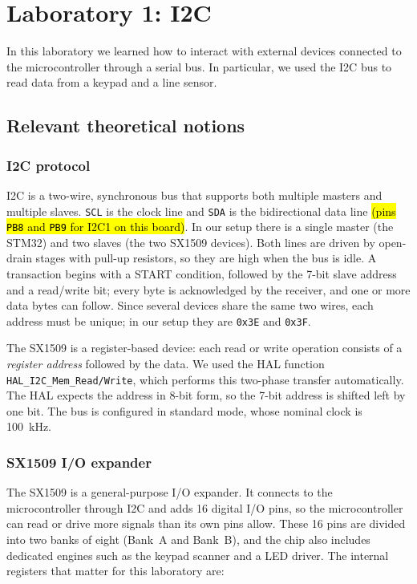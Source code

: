 \documentclass[english]{article}
\begin{document}
\tableofcontents \newpage

\section{Laboratory 1: I2C}

In this laboratory we learned how to interact with external devices connected to the microcontroller through a
serial bus. In particular, we used the I2C bus to read data from a keypad and a line sensor.

\subsection{Relevant theoretical notions}
\label{sec:lab1-theory}

\subsubsection{I2C protocol}

I2C is a two-wire, synchronous bus that supports both multiple masters and multiple slaves. \texttt{SCL} is
the clock line and \texttt{SDA} is the bidirectional data line \hl{(pins \texttt{PB8} and \texttt{PB9} for
  I2C1 on this board)}. In our setup there is a single master (the STM32) and two slaves (the two SX1509
devices). Both lines are driven by open-drain stages with pull-up resistors, so they are high when the bus is
idle. A transaction begins with a START condition, followed by the 7-bit slave address and a read/write bit;
every byte is acknowledged by the receiver, and one or more data bytes can follow. Since several devices
share the same two wires, each address must be unique; in our setup they are \texttt{0x3E} and \texttt{0x3F}.

The SX1509 is a register-based device: each read or write operation consists of a \emph{register address}
followed by the data. We used the HAL function \texttt{HAL\_I2C\_Mem\_Read/Write}, which performs this
two-phase transfer automatically. The HAL expects the address in 8-bit form, so the 7-bit address is shifted
left by one bit. The bus is configured in standard mode, whose nominal clock is 100~kHz.

\subsubsection{SX1509 I/O expander}

The SX1509 is a general-purpose I/O expander. It connects to the microcontroller through I2C
and adds 16 digital I/O pins, so the microcontroller can read or drive more signals than its own pins allow.
These 16 pins are divided into two banks of eight (Bank~A and Bank~B), and the chip also includes dedicated
engines such as the keypad scanner and a LED driver. The internal registers that matter for this laboratory
are:
\end{document}
